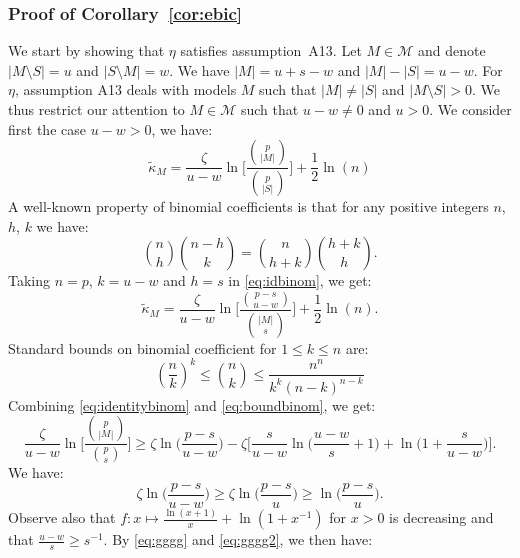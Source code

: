 \documentclass[aos]{imsart}
\theoremstyle{plain}
\newcommand{\M}{\mathcal{M}}
\begin{document}
\subsubsection{Proof of Corollary~\ref{cor:ebic}}
We start by showing that $\eta$ satisfies assumption~A13. Let $M\in\M$ and denote $|M\setminus S|=u$ and $|S\setminus M|=w$. We have $|M|=u+s-w$ and $|M|-|S|=u-w$. For $\eta$, assumption A13 deals with models $M$ such that $|M|\neq |S|$ and $|M\setminus S|>0$. We thus restrict our attention to $M\in\mathcal{M}$ such that $u- w\neq0$ and $u>0$. We consider first the case $u-w>0$, we have:
    \begin{equation*}
        \tilde{\kappa}_{M}=\frac{\zeta}{u-w}\ln\bigg[\frac{\binom{p}{|M|}}{\binom{p}{|S|}}\bigg]+ \frac{1}{2}\ln(n)
    \end{equation*}
    A well-known property of binomial coefficients is that for any positive integers $n$, $h$, $k$ we have:
    \begin{equation}\label{eq:idbinom}
        \binom{n}{h}\binom{n-h}{k}=\binom{n}{h+k}\binom{h+k}{h}.
    \end{equation}
    Taking $n=p$, $k=u-w$ and $h=s$ in \eqref{eq:idbinom}, we get:
    \begin{equation}\label{eq:identitybinom}
        \tilde{\kappa}_{M}=\frac{\zeta}{u-w}\ln\bigg[\frac{\binom{p -s}{u-w}}{\binom{|M|}{s}}\bigg]+ \frac{1}{2}\ln(n)        .
    \end{equation}
Standard bounds on binomial coefficient for $1\leq k\leq n$ are:
\begin{equation}\label{eq:boundbinom}
  \left(\frac{n}{k}\right)^k \leq  \binom{n}{k} \leq \frac{n^n}{k^k(n-k)^{n-k}}
\end{equation}
Combining \eqref{eq:identitybinom} and \eqref{eq:boundbinom}, we get:
\begin{equation}\label{eq:gggg}
    \frac{\zeta}{u-w}\ln\bigg[\frac{\binom{p}{|M|}}{\binom{p}{s}}\bigg] \geq \zeta\ln\bigg(\frac{p-s}{u-w}\bigg)-\zeta\bigg[\frac{s}{u-w}\ln\bigg(\frac{u-w}{s}+1\bigg) +\ln\bigg(1+\frac{s}{u-w}\bigg) \bigg].
\end{equation}
We have:
\begin{equation}\label{eq:gggg2}
\zeta\ln\bigg(\frac{p-s}{u-w}\bigg) \geq \zeta\ln\bigg(\frac{p-s}{u}\bigg) \geq \ln\bigg(\frac{p-s}{u}\bigg).\end{equation}
Observe also that $f:x \mapsto \frac{\ln(x+1)}{x}+\ln(1+{x}^{-1})$ for $x>0$ is decreasing and that $\frac{u-w}{s} \geq s^{-1}$. By \eqref{eq:gggg} and \eqref{eq:gggg2}, we then have: 
\end{document}
